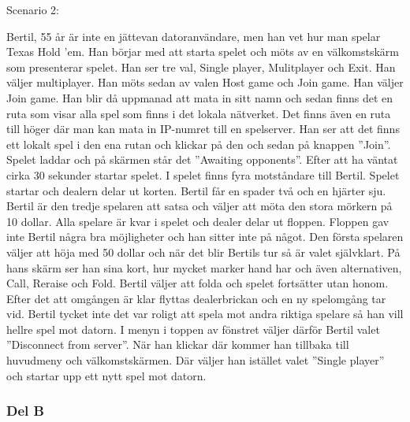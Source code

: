 \documentclass[10pt,a4paper]{article}
\begin{document}
\vspace{1em}
\noindent
Scenario 2:

\vspace{1em}
\noindent
Bertil, 55 år är inte en jättevan datoranvändare, men han vet hur man
spelar Texas Hold ’em. Han börjar med att starta spelet och möts av en
välkomstskärm som presenterar spelet. Han ser tre val, Single player,
Mulitplayer och Exit. Han väljer multiplayer. Han möts sedan av valen Host
game och Join game. Han väljer Join game. Han blir då uppmanad att mata in
sitt namn och sedan finns det en ruta som visar alla spel som finns i det
lokala nätverket. Det finns även en ruta till höger där man kan mata in
IP-numret till en spelserver. Han ser att det finns ett lokalt spel i den
ena rutan och klickar på den och sedan på knappen ”Join”. Spelet laddar och
på skärmen står det ”Awaiting opponents”. Efter att ha väntat cirka 30
sekunder startar spelet. I spelet finns fyra motståndare till Bertil.
Spelet startar och dealern delar ut korten. Bertil får en spader två och en
hjärter sju. Bertil är den tredje spelaren att satsa och väljer att möta
den stora mörkern på 10 dollar. Alla spelare är kvar i spelet och dealer
delar ut floppen. Floppen gav inte Bertil några bra möjligheter och han
sitter inte på något. Den första spelaren väljer att höja med 50 dollar och
när det blir Bertils tur så är valet självklart. På hans skärm ser han sina
kort, hur mycket marker hand har och även alternativen, Call, Reraise och
Fold. Bertil väljer att folda och spelet fortsätter utan honom. Efter det
att omgången är klar flyttas dealerbrickan och en ny spelomgång tar vid.
Bertil tycket inte det var roligt att spela mot andra riktiga spelare så
han vill hellre spel mot datorn. I menyn i toppen av fönstret väljer därför
Bertil valet ”Disconnect from server”. När han klickar där kommer han
tillbaka till huvudmeny och välkomstskärmen. Där väljer han istället valet
”Single player” och startar upp ett nytt spel mot datorn.

\subsubsection*{Del B}
\end{document}
